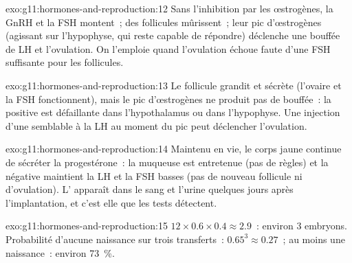 \begin{solution}{exo:g11:hormones-and-reproduction:12}
Sans l'inhibition par les œstrogènes, la GnRH et la FSH montent~; des
follicules mûrissent~; leur pic d'œstrogènes (agissant sur l'hypophyse,
qui reste capable de répondre) déclenche une bouffée de LH et
l'ovulation. On l'emploie quand l'ovulation échoue faute d'une FSH
suffisante pour les follicules.
\end{solution}

\begin{solution}{exo:g11:hormones-and-reproduction:13}
Le follicule grandit et sécrète (l'ovaire et la FSH fonctionnent), mais
le pic d'œstrogènes ne produit pas de bouffée~: la  positive
est défaillante dans l'hypothalamus ou dans l'hypophyse. Une injection
d'une  semblable à la LH au moment du pic peut déclencher
l'ovulation.
\end{solution}

\begin{solution}{exo:g11:hormones-and-reproduction:14}
Maintenu en vie, le corps jaune continue de sécréter la progestérone~:
la muqueuse est entretenue (pas de règles) et la  négative
maintient la LH et la FSH basses (pas de nouveau follicule ni
d'ovulation). L' apparaît dans le sang et l'urine quelques jours
après l'implantation, et c'est elle que les tests détectent.
\end{solution}

\begin{solution}{exo:g11:hormones-and-reproduction:15}
$12 \times 0.6 \times 0.4 \approx 2.9$~: environ 3 embryons.
Probabilité d'aucune naissance sur trois transferts~:
$0.65^3 \approx 0.27$~; au moins une naissance~: environ 73~\%.
\end{solution}


